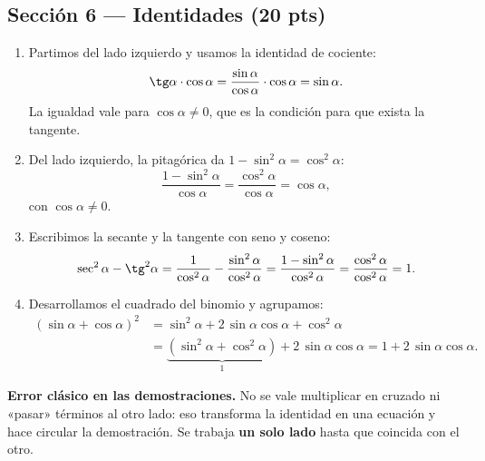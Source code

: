 \documentclass[12pt, letterpaper]{article}
\providecommand{\sen}{\sin}
\begin{document}
\clearpage
\subsection*{Sección 6 — Identidades (20 pts)}
\begin{enumerate}[leftmargin=*, label=\textbf{\alph*)}]
  \item Partimos del lado izquierdo y usamos la identidad de cociente:
        \[
          \tg\alpha\cdot\cos\alpha
          =\frac{\sen\alpha}{\cos\alpha}\cdot\cos\alpha
          =\sen\alpha .
        \]
        La igualdad vale para $\cos\alpha\neq0$, que es la condición para que
        exista la tangente.

  \item Del lado izquierdo, la pitagórica da $1-\sen^{2}\alpha=\cos^{2}\alpha$:
        \[
          \frac{1-\sen^{2}\alpha}{\cos\alpha}
          =\frac{\cos^{2}\alpha}{\cos\alpha}=\cos\alpha ,
        \]
        con $\cos\alpha\neq0$.

  \item Escribimos la secante y la tangente con seno y coseno:
        \[
          \sec^{2}\alpha-\tg^{2}\alpha
          =\frac{1}{\cos^{2}\alpha}-\frac{\sen^{2}\alpha}{\cos^{2}\alpha}
          =\frac{1-\sen^{2}\alpha}{\cos^{2}\alpha}
          =\frac{\cos^{2}\alpha}{\cos^{2}\alpha}=1 .
        \]

  \item Desarrollamos el cuadrado del binomio y agrupamos:
        \begin{align*}
          \left(\sen\alpha+\cos\alpha\right)^{2}
          &=\sen^{2}\alpha+2\,\sen\alpha\cos\alpha+\cos^{2}\alpha\\
          &=\underbrace{\left(\sen^{2}\alpha+\cos^{2}\alpha\right)}_{1}
            +2\,\sen\alpha\cos\alpha
           =1+2\,\sen\alpha\cos\alpha .
        \end{align*}
\end{enumerate}

\begin{cuadroadvertencia}
  \small
  \textbf{Error clásico en las demostraciones.} No se vale multiplicar en
  cruzado ni «pasar» términos al otro lado: eso transforma la identidad en una
  ecuación y hace circular la demostración. Se trabaja \textbf{un solo lado}
  hasta que coincida con el otro.
\end{cuadroadvertencia}
\end{document}
